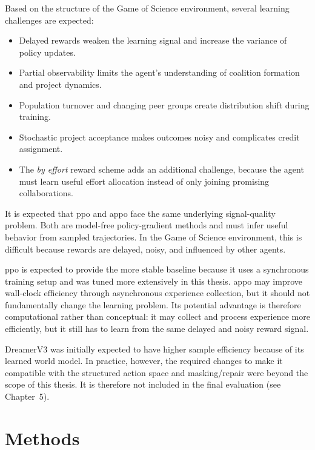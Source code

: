 \documentclass[english,bachelor]{hsluthesis}
\begin{document}
Based on the structure of the Game of Science environment, several learning challenges are expected:

\begin{itemize}
    \item Delayed rewards weaken the learning signal and increase the variance of policy updates.
    \item Partial observability limits the agent's understanding of coalition formation and project dynamics.
    \item Population turnover and changing peer groups create distribution shift during training.
    \item Stochastic project acceptance makes outcomes noisy and complicates credit assignment.
    \item The \textit{by effort} reward scheme adds an additional challenge, because the agent must learn useful effort allocation instead of only joining promising collaborations.
\end{itemize}

It is expected that \gls{ppo} and \gls{appo} face the same underlying signal-quality problem. Both are model-free policy-gradient methods and must infer useful behavior from sampled trajectories. In the Game of Science environment, this is difficult because rewards are delayed, noisy, and influenced by other agents.

\gls{ppo} is expected to provide the more stable baseline because it uses a synchronous training setup and was tuned more extensively in this thesis. \gls{appo} may improve wall-clock efficiency through asynchronous experience collection, but it should not fundamentally change the learning problem. Its potential advantage is therefore computational rather than conceptual: it may collect and process experience more efficiently, but it still has to learn from the same delayed and noisy reward signal.

DreamerV3 was initially expected to have higher sample efficiency because of its learned world model. In practice, however, the required changes to make it compatible with the structured action space and masking/repair were beyond the scope of this thesis. It is therefore not included in the final evaluation (see Chapter~5).

\chapter{Methods}
\end{document}
